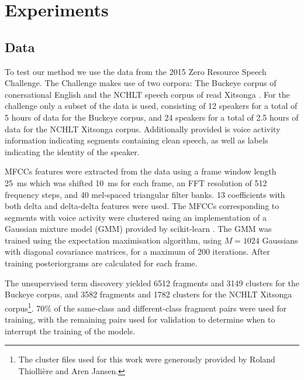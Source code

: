 \section{Experiments}
\label{sec:experiments}

\subsection{Data}
To test our method we use the data from the 2015 Zero Resource Speech Challenge.
The Challenge makes use of two corpora: The Buckeye corpus of conersational English \parencite{buckeyecorpus} and the NCHLT speech corpus of read Xitsonga \parencite{barnard2014nchlt}.
For the challenge only a subset of the data is used, consisting of 12 speakers for a total of 5 hours of data for the Buckeye corpus, and 24 speakers for a total of 2.5 hours of data for the NCHLT Xitsonga corpus.
Additionally provided is voice activity information indicating segments containing clean speech, as well as labels indicating the identity of the speaker.

MFCCs features were extracted from the data using a frame window length \SI{25}{\ms} which was shifted \SI{10}{\ms} for each frame, an FFT resolution of 512 frequency steps, and 40 mel-spaced triangular filter banks.
13 coefficients with both delta and delta-delta features were used.
The MFCCs corresponding to segments with voice activity were clustered using an implementation of a Gaussian mixture model (GMM) provided by scikit-learn \parencite{scikit-learn}.
The GMM was trained using the expectation maximisation algorithm, using $M = 1024$ Gaussians with diagonal covariance matrices, for a maximum of 200 iterations.
After training posteriorgrams are calculated for each frame.

The unsupervised term discovery yielded 6512 fragments and 3149 clusters for the Buckeye corpus, and 3582 fragments and 1782 clusters for the NCHLT Xitsonga corpus\footnote{The cluster files used for this work were generously provided by Roland Thiollière and Aren Jansen.}.
70\% of the same-class and different-class fragment pairs were used for training, with the remaining pairs used for validation to determine when to interrupt the training of the models.


